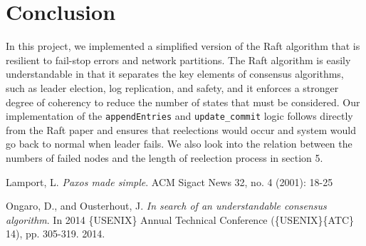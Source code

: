 \documentclass[11pt]{article}
\begin{document}
\section{Conclusion}

In this project, we implemented a simplified version of the Raft algorithm that is resilient to fail-stop errors and network partitions. The Raft algorithm is easily understandable in that it separates the key elements of consensus algorithms, such as leader election, log replication, and safety, and it enforces a stronger degree of coherency to reduce the number of states that must be considered. Our implementation of the \texttt{appendEntries} and \texttt{update\_commit} logic follows directly from the Raft paper \cite{Raft} and ensures that reelections would occur and system would go back to normal when leader fails. We also look into the relation between the numbers of failed nodes and the length of reelection process in section 5. 

\begin{thebibliography}{9}
Lamport, L. 
\textit{Paxos made simple}. 
ACM Sigact News 32, no. 4 (2001): 18-25


Ongaro, D., and Ousterhout, J. \textit{In search of an understandable consensus algorithm}. In 2014 \{USENIX\} Annual Technical Conference (\{USENIX\}\{ATC\} 14), pp. 305-319. 2014.


\end{thebibliography}
\end{document}
